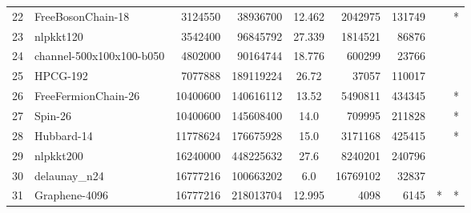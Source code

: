 \begin{tabular}{|l|l|r|r|S[round-mode=places,round-precision=2]|r|r|r|c|}
{22}& {FreeBosonChain-18}	& 3124550	& 38936700	& 12.462	& 2042975	& 131749	& {} &	{*} \\
{23}& {nlpkkt120}	& 3542400	& 96845792	& 27.339	& 1814521	& 86876	& {} &	\\
{24}& {channel-500x100x100-b050}	& 4802000	& 90164744	& 18.776	& 600299	& 23766	& {} &	\\
{25}& {HPCG-192}	& 7077888	& 189119224	& 26.72	& 37057	& 110017	& {} &	\\
{26}& {FreeFermionChain-26}	& 10400600	& 140616112	& 13.52	& 5490811	& 434345	& {} & {*}	\\
{27}& {Spin-26}	& 10400600	& 145608400	& 14.0	& 709995	& 211828	& {} &	{*} \\
{28}& {Hubbard-14}	& 11778624	& 176675928	& 15.0	& 3171168	& 425415	& {} &	{*} \\
{29}& {nlpkkt200}	& 16240000	& 448225632	& 27.6	& 8240201	& 240796	& {} &	\\
{30}& {delaunay\_n24}	& 16777216	& 100663202	& 6.0	& 16769102	& 32837	& {} &	\\
{31}& {Graphene-4096}	& 16777216	& 218013704	& 12.995	& 4098	& 6145	& {*} &	{*} \\
\bottomrule
\end{tabular}



